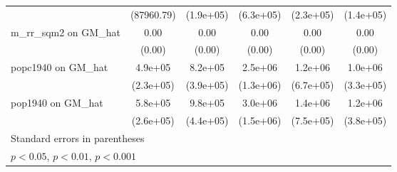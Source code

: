 \begin{table}[htbp]
\begin{tabular}{l*{5}{c}}
                &(87960.79)         &(1.9e+05)         &(6.3e+05)         &(2.3e+05)         &(1.4e+05)         \\
\addlinespace
m\_rr\_sqm2 on GM\_hat&     0.00         &     0.00         &     0.00\sym{*}  &     0.00         &     0.00\sym{**} \\
                &   (0.00)         &   (0.00)         &   (0.00)         &   (0.00)         &   (0.00)         \\
\addlinespace
popc1940 on GM\_hat&  4.9e+05\sym{*}  &  8.2e+05\sym{*}  &  2.5e+06         &  1.2e+06         &  1.0e+06\sym{**} \\
                &(2.3e+05)         &(3.9e+05)         &(1.3e+06)         &(6.7e+05)         &(3.3e+05)         \\
\addlinespace
pop1940 on GM\_hat&  5.8e+05\sym{*}  &  9.8e+05\sym{*}  &  3.0e+06\sym{*}  &  1.4e+06         &  1.2e+06\sym{**} \\
                &(2.6e+05)         &(4.4e+05)         &(1.5e+06)         &(7.5e+05)         &(3.8e+05)         \\
\bottomrule
\multicolumn{6}{l}{\footnotesize Standard errors in parentheses}\\
\multicolumn{6}{l}{\footnotesize \sym{*} \(p<0.05\), \sym{**} \(p<0.01\), \sym{***} \(p<0.001\)}\\
\end{tabular}
\end{table}
